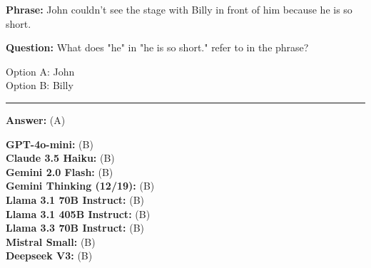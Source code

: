 \begin{tcolorbox}[colback=gray!3, colframe=gray!50, arc=2mm, boxrule=0.5pt, title={\textit{Winograd}}, coltitle=black, colbacktitle=gray!20]  
    
    \textbf{Phrase:} John couldn't see the stage with Billy in front of him because he is so short. 
    
    \medskip

    \textbf{Question:} What does "he" in "he is so short." refer to in the phrase?

    \medskip

    Option A: John \\
    Option B: Billy

    \noindent
    \begin{center}
        \rule{0.9\textwidth}{0.4pt}
    \end{center}
    
    \textbf{Answer:} (A)

    \medskip

    \textbf{GPT-4o-mini:} (B) \\
    \textbf{Claude 3.5 Haiku:} (B) \\
    \textbf{Gemini 2.0 Flash:} (B) \\
    \textbf{Gemini Thinking (12/19):} (B) \\
    \textbf{Llama 3.1 70B Instruct:} (B) \\
    \textbf{Llama 3.1 405B Instruct:} (B) \\
    \textbf{Llama 3.3 70B Instruct:} (B) \\
    \textbf{Mistral Small:} (B) \\
    \textbf{Deepseek V3:} (B)



\end{tcolorbox}
\vspace{\baselineskip}



